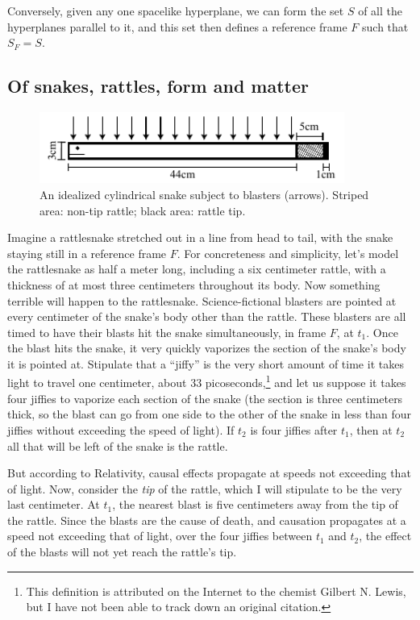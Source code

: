 Conversely, given any one spacelike hyperplane, we can form the set $S$ of all the hyperplanes parallel to it, and this 
set then defines a reference frame $F$ such that $S_F=S$.

\subsection{Of snakes, rattles, form and matter}
\begin{figure}\label{fig:snake}
\includegraphics[width=10cm]{snake.pdf}
\caption{An idealized cylindrical snake subject to blasters (arrows). Striped area: non-tip rattle; black area: rattle tip.} 
\end{figure}
Imagine a rattlesnake stretched out in a line from head to tail, with the snake staying still in a reference frame $F$. For concreteness and 
simplicity, let's model the rattlesnake as half a meter long, including a six centimeter rattle, with a thickness of at 
most three centimeters throughout its body. Now something terrible will happen to the rattlesnake. Science-fictional blasters 
are pointed at every centimeter of the  snake's body other than the rattle. These blasters are all timed to have their blasts 
hit the snake simultaneously, in frame $F$, at $t_1$. Once the blast hits the snake, it very quickly vaporizes the section 
of the snake's body it is pointed at. Stipulate that a ``jiffy'' is the very short amount of time it takes light to travel one 
centimeter, about 33 picoseconds,\footnote{This definition is attributed on the Internet to the chemist Gilbert N. Lewis, but 
I have not been able to track 
down an original citation.} and let us suppose it takes four jiffies to vaporize each section of the snake (the section 
is three centimeters thick, so the blast can go from one side to the other of the snake in less than four jiffies without exceeding the 
speed of light). If $t_2$ is four jiffies after $t_1$, then at $t_2$ all that will be left of the snake is the rattle. 

But according to Relativity, causal effects propagate at speeds not exceeding that of light. Now, consider the \textit{tip}
of the rattle, which I will stipulate to be the very last centimeter. At $t_1$, the nearest blast is five centimeters away from 
the tip of the rattle. Since the blasts are the cause of death, and causation propagates at a speed not exceeding that of light,
over the four jiffies between $t_1$ and $t_2$, the effect of the blasts will not yet reach the rattle's tip. 

